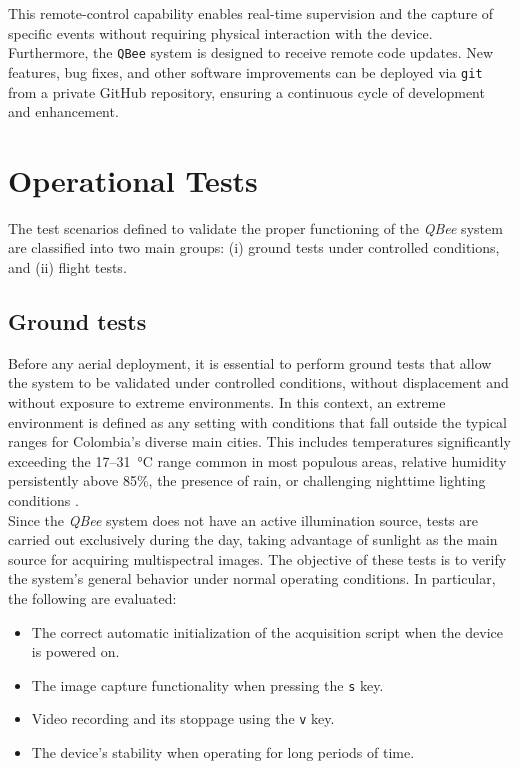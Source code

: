 \noindent This remote-control capability enables real-time supervision and the capture of specific events without requiring physical interaction with the device. Furthermore, the \texttt{QBee} system is designed to receive remote code updates. New features, bug fixes, and other software improvements can be deployed via \texttt{git} from a private GitHub repository, ensuring a continuous cycle of development and enhancement.


\section{Operational Tests}
  
The test scenarios defined to validate the proper functioning of the \textit{QBee} system are classified into two main groups: (i) ground tests under controlled conditions, and (ii) flight tests.

\subsection{Ground tests}
    
Before any aerial deployment, it is essential to perform ground tests that allow the system to be validated under controlled conditions, without displacement and without exposure to extreme environments. In this context, an extreme environment is defined as any setting with conditions that fall outside the typical ranges for Colombia's diverse main cities. This includes temperatures significantly exceeding the 17--31~\si{\celsius} range common in most populous areas, relative humidity persistently above 85\%, the presence of rain, or challenging nighttime lighting conditions \cite{weatherspark_colombia_climate}.\\

        
\noindent Since the \textit{QBee} system does not have an active illumination source, tests are carried out exclusively during the day, taking advantage of sunlight as the main source for acquiring multispectral images. The objective of these tests is to verify the system's general behavior under normal operating conditions. In particular, the following are evaluated:
        
\begin{itemize}
\item The correct automatic initialization of the acquisition script when the device is powered on.
\item The image capture functionality when pressing the \texttt{s} key.
\item Video recording and its stoppage using the \texttt{v} key.
\item The device’s stability when operating for long periods of time.
\end{itemize}
        
